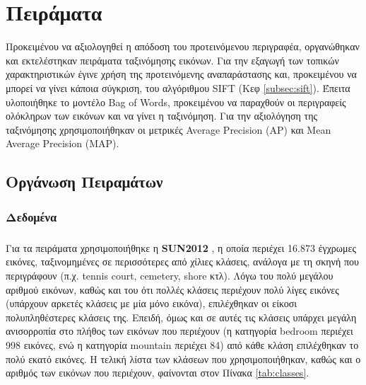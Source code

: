 \chapter{Πειράματα}
Προκειμένου να αξιολογηθεί η απόδοση του προτεινόμενου περιγραφέα, οργανώθηκαν και εκτελέστηκαν πειράματα ταξινόμησης εικόνων. Για την εξαγωγή των τοπικών χαρακτηριστικών έγινε χρήση της προτεινόμενης αναπαράστασης και, προκειμένου να μπορεί να γίνει κάποια σύγκριση, του αλγόριθμου SIFT (Κεφ \ref{subsec:sift}). Έπειτα υλοποιήθηκε το μοντέλο Bag of Words, προκειμένου να παραχθούν οι περιγραφείς ολόκληρων των εικόνων και να γίνει η ταξινόμηση. Για την αξιολόγηση της ταξινόμησης χρησιμοποιήθηκαν οι μετρικές Average Precision (AP) και Mean Average Precision (MAP).


\section{Οργάνωση Πειραμάτων}
\subsection{Δεδομένα}
\paragraph*{}
Για τα πειράματα χρησιμοποιήθηκε η \textbf{SUN2012} \cite{sundb}, η οποία περιέχει 16.873 έγχρωμες εικόνες, ταξινομημένες σε περισσότερες από χίλιες κλάσεις, ανάλογα με τη σκηνή που περιγράφουν (π.χ. tennis court, cemetery, shore κτλ). Λόγω του πολύ μεγάλου αριθμού εικόνων, καθώς και του ότι πολλές κλάσεις περιέχουν πολύ λίγες εικόνες (υπάρχουν αρκετές κλάσεις με μία μόνο εικόνα), επιλέχθηκαν οι είκοσι πολυπληθέστερες κλάσεις της. Επειδή, όμως και σε αυτές τις κλάσεις υπάρχει μεγάλη ανισορροπία στο πλήθος των εικόνων που περιέχουν (η κατηγορία bedroom περιέχει 998 εικόνες, ενώ η κατηγορία mountain περιέχει 84) από κάθε κλάση επιλέχθηκαν το πολύ εκατό εικόνες. Η τελική λίστα των κλάσεων που χρησιμοποιήθηκαν, καθώς και ο αριθμός των εικόνων που περιέχουν, φαίνονται στον Πίνακα \ref{tab:classes}.



